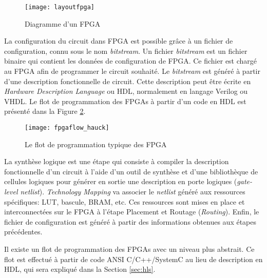 \begin{figure}[h]
	\centering
	\texttt{[image: layoutfpga]}
	\caption{Diagramme d'un FPGA\cite{fpgaprototype}}
	\label{fig:layoutfpga}
	\vspace{-2mm}
\end{figure}

La configuration du circuit dans FPGA est possible grâce à un fichier de configuration, connu sous le nom
\emph{bitstream}. Un fichier \emph{bitstream} est un fichier binaire qui contient les données de configuration
de FPGA. Ce fichier est chargé au FPGA afin de programmer le circuit souhaité.
Le \emph{bitstream} est généré à partir d'une description fonctionnelle de circuit.
Cette description peut être écrite en \emph{Hardware Description Language} ou HDL, normalement
en langage Verilog ou VHDL. Le flot de programmation des FPGAs à partir d'un code en HDL est présenté dans la Figure \ref{fig:fpgaflow}. 

\begin{figure}[h]
	\centering
	\texttt{[image: fpgaflow\_hauck]}
	\caption{Le flot de programmation typique des FPGA}
	\label{fig:fpgaflow}
	\vspace{-2mm}
\end{figure}

La synthèse logique est une étape qui consiste à compiler la description fonctionnelle d'un circuit à l'aide d'un outil de synthèse et
d'une bibliothèque de cellules logiques pour générer en sortie une description en porte logiques (\emph{gate-level netlist}).
\emph{Technology Mapping} va associer le \emph{netlist} généré aux ressources spécifiques: LUT, bascule, BRAM, etc.
Ces ressources sont mises en place et interconnectées sur le FPGA à l'étape Placement et Routage (\emph{Routing}).
Enfin, le fichier de configuration est généré à partir des informations obtenues aux étapes précédentes.

Il existe un flot de programmation des FPGAs avec un niveau plus abstrait. Ce flot est effectué à partir de code ANSI C/C++/SystemC
au lieu de description en HDL, qui sera expliqué dans la Section \ref{sec:hls}.

